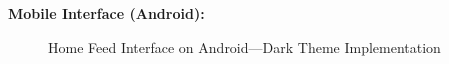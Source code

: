 \textbf{Mobile Interface (Android):}
\begin{figure}[!htbp]
    \centering
    \hspace{0.05\textwidth}
    \caption{Home Feed Interface on Android---Dark Theme Implementation}\label{fig:android_home}
\end{figure}

